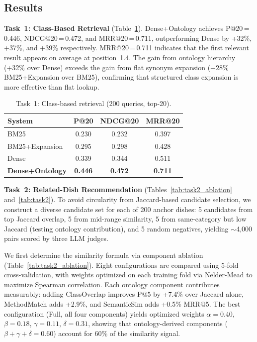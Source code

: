 \subsection{Results}

\textbf{Task~1: Class-Based Retrieval} (Table~\ref{tab:task1}).
Dense+Ontology achieves P@20\,=\,0.446, NDCG@20\,=\,0.472, and MRR@20\,=\,0.711, outperforming Dense by +32\%, +37\%, and +39\% respectively. MRR@20\,=\,0.711 indicates that the first relevant result appears on average at position~1.4. The gain from ontology hierarchy (+32\% over Dense) exceeds the gain from flat synonym expansion (+28\% BM25+Expansion over BM25), confirming that structured class expansion is more effective than flat lookup.

\begin{table}[t]
\centering
\caption{Task~1: Class-based retrieval (200 queries, top-20).}
\label{tab:task1}
\small
\begin{tabular}{lccc}
\toprule
\textbf{System} & \textbf{P@20} & \textbf{NDCG@20} & \textbf{MRR@20} \\
\midrule
BM25              & 0.230 & 0.232 & 0.397 \\
BM25+Expansion    & 0.295 & 0.298 & 0.428 \\
Dense             & 0.339 & 0.344 & 0.511 \\
\textbf{Dense+Ontology} & \textbf{0.446} & \textbf{0.472} & \textbf{0.711} \\
\bottomrule
\end{tabular}
\end{table}

\textbf{Task~2: Related-Dish Recommendation} (Tables~\ref{tab:task2_ablation} and~\ref{tab:task2}).
To avoid circularity from Jaccard-based candidate selection, we construct a diverse candidate set for each of 200 anchor dishes: 5 candidates from top Jaccard overlap, 5 from mid-range similarity, 5 from same-category but low Jaccard (testing ontology contribution), and 5 random negatives, yielding ${\sim}$4{,}000 pairs scored by three LLM judges.

We first determine the similarity formula via component ablation (Table~\ref{tab:task2_ablation}). Eight configurations are compared using 5-fold cross-validation, with weights optimized on each training fold via Nelder-Mead to maximize Spearman correlation. Each ontology component contributes measurably: adding ClassOverlap improves P@5 by +7.4\% over Jaccard alone, MethodMatch adds +2.9\%, and SemanticSim adds +0.5\% MRR@5. The best configuration (Full, all four components) yields optimized weights $\alpha = 0.40$, $\beta = 0.18$, $\gamma = 0.11$, $\delta = 0.31$, showing that ontology-derived components ($\beta + \gamma + \delta = 0.60$) account for 60\% of the similarity signal.

